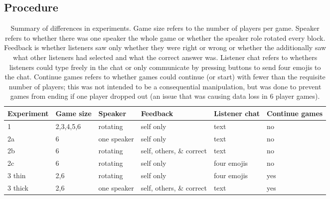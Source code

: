 \documentclass[
  english,
  a4paper,
]{article}
\begin{document}
\hypertarget{procedure}{%
\subsection{Procedure}\label{procedure}}

\begin{table}

\caption{\label{tab:overview}Summary of differences in experiments. Game size refers to the number of players per game. Speaker refers to whether there was one speaker the whole game or whether the speaker role rotated every block. Feedback is whether listeners saw only whether they were right or wrong or whether the additionally saw what other listeners had selected and what the correct answer was. Listener chat refers to whethers listeners could type freely in the chat or only communicate by pressing buttons to send four emojis to the chat. Continue games refers to whether games could continue (or start) with fewer than the requisite number of players; this was not intended to be a consequential manipulation, but was done to prevent games from ending if one player dropped out (an issue that was causing data loss in 6 player games). }
\centering
\begin{tabular}[t]{l|l|l|l|l|l}
\hline
Experiment & Game size & Speaker & Feedback & Listener chat & Continue games\\
\hline
1 & 2,3,4,5,6 & rotating & self only & text & no\\
\hline
2a & 6 & one speaker & self only & text & no\\
\hline
2b & 6 & rotating & self, others, \& correct & text & no\\
\hline
2c & 6 & rotating & self only & four emojis & no\\
\hline
3 thin & 2,6 & rotating & self only & four emojis & yes\\
\hline
3 thick & 2,6 & one speaker & self, others, \& correct & text & yes\\
\hline
\end{tabular}
\end{table}
\end{document}
